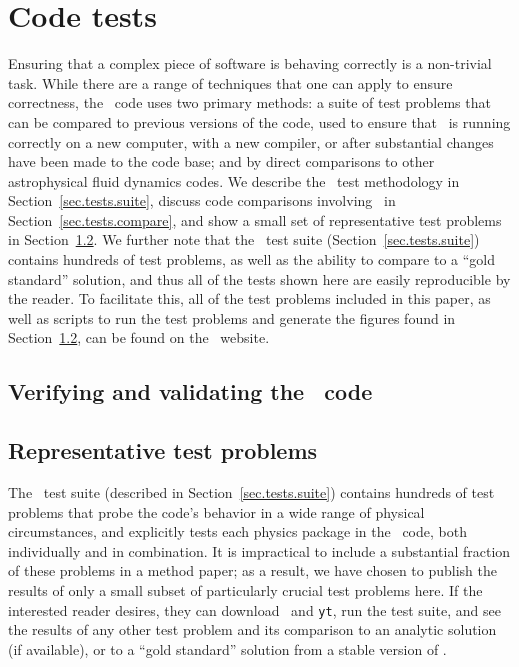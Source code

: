 
\section{Code tests}
\label{sec.tests}

Ensuring that a complex piece of software is behaving correctly is a
non-trivial task.  While there are a range of techniques that one can
apply to ensure correctness, the \enzo\ code uses two primary methods:
a suite of test problems that can be compared to previous versions of
the code, used to ensure that \enzo\ is running correctly on a new
computer, with a new compiler, or after substantial changes have been
made to the code base; and by direct comparisons to other
astrophysical fluid dynamics codes.  We describe the \enzo\ test
methodology in Section~\ref{sec.tests.suite}, discuss code comparisons
involving \enzo\ in Section~\ref{sec.tests.compare}, and show a small
set of representative test problems in
Section~\ref{sec.tests.problems}.  We further note that the \enzo\
test suite (Section~\ref{sec.tests.suite}) contains hundreds of test
problems, as well as the ability to compare to a ``gold standard''
solution, and thus all of the tests shown here are easily reproducible
by the reader.  To facilitate this, all of the test problems included
in this paper, as well as scripts to run the test problems and
generate the figures found in Section~\ref{sec.tests.problems}, can be
found on the \enzo\ website.

\subsection{Verifying and validating the \enzo\ code}
\label{sec.tests.vandv}



\subsection{Representative test problems}
\label{sec.tests.problems}

The \enzo\ test suite (described in Section~\ref{sec.tests.suite})
contains hundreds of test problems that probe the code's behavior in a
wide range of physical circumstances, and explicitly tests each physics
package in the \enzo\ code, both individually and in combination.  It
is impractical to include a substantial fraction of these problems in
a method paper; as a result, we have chosen to publish the results of
only a small subset of particularly crucial test problems here.  If
the interested reader desires, they can download \enzo\ and
\texttt{yt}, run the test suite, and see the results of any other test
problem and its comparison to an analytic solution (if available), or
to a ``gold standard'' solution from a stable version of \enzo.

